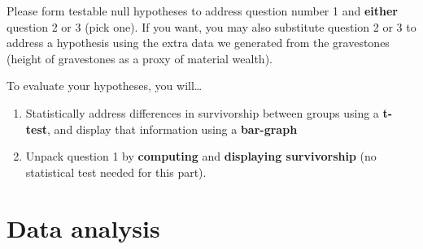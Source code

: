 \documentclass[]{book}
\providecommand{\tightlist}{%
  \setlength{\itemsep}{0pt}\setlength{\parskip}{0pt}}
\theoremstyle{definition}
\theoremstyle{definition}
\theoremstyle{definition}
\theoremstyle{remark}
\begin{document}
Please form testable null hypotheses to address question number 1 and
\textbf{either} question 2 or 3 (pick one). If you want, you may also
substitute question 2 or 3 to address a hypothesis using the extra data
we generated from the gravestones (height of gravestones as a proxy of
material wealth).

To evaluate your hypotheses, you will\ldots{}

\begin{enumerate}
\def\labelenumi{\arabic{enumi}.}
\tightlist
\item
  Statistically address differences in survivorship between groups using
  a \textbf{t-test}, and display that information using a
  \textbf{bar-graph}
\item
  Unpack question 1 by \textbf{computing} and \textbf{displaying
  survivorship} (no statistical test needed for this part).
\end{enumerate}

\section{Data analysis}\label{data-analysis}
\end{document}
